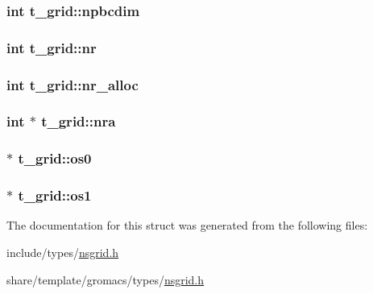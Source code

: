 \hypertarget{structt__grid_aad606564746368b18ef3300b07453968}{
\subsubsection[{npbcdim}]{\setlength{\rightskip}{0pt plus 5cm}int {\bf t\-\_\-grid\-::npbcdim}}}\label{structt__grid_aad606564746368b18ef3300b07453968}
\hypertarget{structt__grid_a383708e4192628ef144b16598866e981}{
\subsubsection[{nr}]{\setlength{\rightskip}{0pt plus 5cm}int {\bf t\-\_\-grid\-::nr}}}\label{structt__grid_a383708e4192628ef144b16598866e981}
\hypertarget{structt__grid_ab13b14953444d83fd0feacdba67e2f53}{
\subsubsection[{nr\-\_\-alloc}]{\setlength{\rightskip}{0pt plus 5cm}int {\bf t\-\_\-grid\-::nr\-\_\-alloc}}}\label{structt__grid_ab13b14953444d83fd0feacdba67e2f53}
\hypertarget{structt__grid_a18a8c385e0bfabe5c7e0cf7959213ea7}{
\subsubsection[{nra}]{\setlength{\rightskip}{0pt plus 5cm}int $\ast$ {\bf t\-\_\-grid\-::nra}}}\label{structt__grid_a18a8c385e0bfabe5c7e0cf7959213ea7}
\hypertarget{structt__grid_a4d65bee6b3eec50f8a2e59ac3a5410cf}{
\subsubsection[{os0}]{ $\ast$ {\bf t\-\_\-grid\-::os0}}}\label{structt__grid_a4d65bee6b3eec50f8a2e59ac3a5410cf}
\hypertarget{structt__grid_a1e6e373ada535810a1d9a5d7900ef3d1}{
\subsubsection[{os1}]{ $\ast$ {\bf t\-\_\-grid\-::os1}}}\label{structt__grid_a1e6e373ada535810a1d9a5d7900ef3d1}


\-The documentation for this struct was generated from the following files\-:\begin{DoxyCompactItemize}
\item 
include/types/\hyperlink{include_2types_2nsgrid_8h}{nsgrid.\-h}\item 
share/template/gromacs/types/\hyperlink{share_2template_2gromacs_2types_2nsgrid_8h}{nsgrid.\-h}\end{DoxyCompactItemize}

